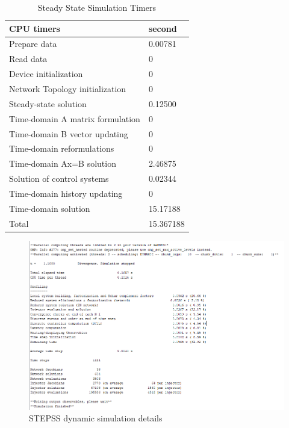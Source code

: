 \documentclass{report}
\begin{document}
\begin{table}
\centering
\caption{Steady State Simulation Timers}
\begin{tabular}{l| l} 
 CPU timers &  second\\
 \hline
 Prepare data&  0.00781\\
 Read data&  0\\
 Device initialization&  0\\
 Network Topology initialization&  0\\
 Steady-state solution&  0.12500\\
 Time-domain A matrix formulation&  0\\
 Time-domain B vector updating&  0\\
 Time-domain reformulations&  0\\
 Time-domain Ax=B solution&  2.46875\\
 Solution of control systems&  0.02344\\
 Time-domain history updating&  0\\
 Time-domain solution&  15.17188\\
 \hline
 Total&  15.367188\\

\end{tabular}
\label{SSS1}
\end{table}
\begin{figure}
    \centering
    \includegraphics[width=1\linewidth]{Figure_Nordic/STEPSSDynamicSimulationDetail.png}
    \caption{STEPSS dynamic simulation details}
    \label{fig:STEPSSDS}
\end{figure}
\end{document}
